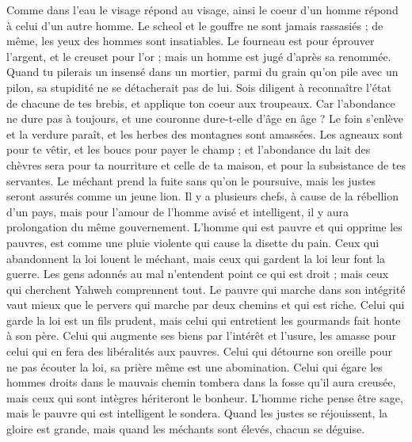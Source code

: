 \begin{multicols}{2}
Comme dans l'eau le visage répond au visage, ainsi le coeur d'un homme répond à celui d'un autre homme.
Le scheol et le gouffre ne sont jamais rassasiés ; de même, les yeux des hommes sont insatiables.
Le fourneau est pour éprouver l'argent, et le creuset pour l'or ; mais un homme est jugé d’après sa renommée.
Quand tu pilerais un insensé dans un mortier, parmi du grain qu'on pile avec un pilon, sa stupidité ne se détacherait pas de lui.
Sois diligent à reconnaître l'état de chacune de tes brebis, et applique ton coeur aux troupeaux.
Car l’abondance ne dure pas à toujours, et une couronne  dure-t-elle d'âge en âge ?
Le foin s’enlève et la verdure paraît, et les herbes des montagnes sont amassées.
Les agneaux sont pour te vêtir, et les boucs pour payer le champ ;
et l'abondance du lait des chèvres sera pour ta nourriture et celle de ta maison, et pour la subsistance de tes servantes.
\VerseOne{}Le méchant prend la fuite sans qu'on le poursuive, mais les justes seront assurés comme un jeune lion.
Il y a plusieurs chefs, à cause de la rébellion d’un pays, mais pour l'amour de l'homme avisé et intelligent, il y aura prolongation du même gouvernement.
L'homme qui est pauvre et qui opprime les pauvres, est comme une pluie violente qui cause la disette du pain.
Ceux qui abandonnent la loi louent le méchant, mais ceux qui gardent la loi leur font la guerre.
Les gens adonnés au mal n'entendent point ce qui est droit ; mais ceux qui cherchent Yahweh comprennent tout.
Le pauvre qui marche dans son intégrité vaut mieux que le pervers qui marche par deux chemins et qui est riche.
Celui qui garde la loi est un fils prudent, mais celui qui entretient les gourmands fait honte à son père.
Celui qui augmente ses biens par l’intérêt et l’usure, les amasse pour celui qui en fera des libéralités aux pauvres.
Celui qui détourne son oreille pour ne pas écouter la loi, sa prière même est une abomination.
Celui qui égare les hommes droits dans le mauvais chemin tombera dans la fosse qu'il aura creusée, mais ceux qui sont intègres hériteront le bonheur.
L'homme riche pense être sage, mais le pauvre qui est intelligent le sondera.
Quand les justes se réjouissent, la gloire est grande, mais quand les méchants sont élevés, chacun se déguise.

\end{multicols}
